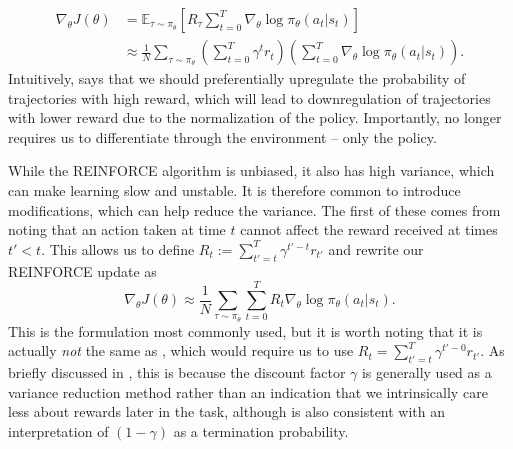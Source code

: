 \begin{align}
    \nabla_\theta J(\theta) & = \mathbb{E}_{\tau \sim \pi_\theta} \left [ R_\tau \sum_{t=0}^T \nabla_\theta \log \pi_\theta (a_t|s_t) \right ]                                         \\
                            & \approx \frac{1}{N} \sum_{\tau \sim \pi_\theta} \left ( \sum_{t=0}^T \gamma^t r_t \right ) \left ( \sum_{t=0}^T \nabla_\theta \log \pi_\theta (a_t|s_t) \right ).
    \label{eq:orig_reinforce}
\end{align}
Intuitively,  says that we should preferentially upregulate the probability of trajectories with high reward, which will lead to downregulation of trajectories with lower reward due to the normalization of the policy.
Importantly,  no longer requires us to differentiate through the environment -- only the policy.

While the REINFORCE algorithm is unbiased, it also has high variance, which can make learning slow and unstable.
It is therefore common to introduce modifications, which can help reduce the variance.
The first of these comes from noting that an action taken at time $t$ cannot affect the reward received at times $t'<t$.
This allows us to define $R_t := \sum_{t'=t}^T \gamma^{t'-t} r_{t'}$ and rewrite our REINFORCE update as
\begin{equation}
    \label{eq:reinforce}
    \nabla_\theta J(\theta) \approx \frac{1}{N} \sum_{\tau \sim \pi_\theta}  \sum_{t=0}^T R_t \nabla_\theta \log \pi_\theta (a_t|s_t).
\end{equation}
This is the formulation most commonly used, but it is worth noting that it is actually \emph{not} the same as , which would require us to use $R_t= \sum_{t'=t}^T \gamma^{t'-0} r_{t'}$.
As briefly discussed in , this is because the discount factor $\gamma$ is generally used as a variance reduction method rather than an indication that we intrinsically care less about rewards later in the task, although  is also consistent with an interpretation of $(1-\gamma)$ as a termination probability.

